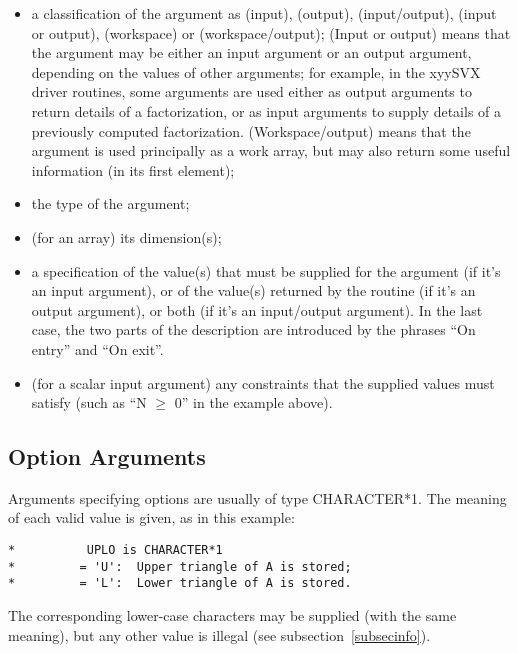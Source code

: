 \begin{itemize}

\item a classification of the argument as (input), (output),
(input/output), (input or output), (workspace) or (workspace/output);
(Input or output) means that the argument may be either an input argument or
an output argument, depending on the values of other arguments;
for example, in the xyySVX driver routines, some arguments are used either
as output arguments to return details of a factorization, or as input
arguments to supply details of a previously computed factorization.
(Workspace/output) means that the argument is used principally as a work
array, but may also return some useful information (in its first 
element);

\item the type of the argument;

\item (for an array) its dimension(s);

\item a specification of the value(s) that must be supplied for the
argument (if it's an input argument), or of the value(s) returned
by the routine (if it's an output argument), or both (if it's an
input/output argument). In the last case, the two parts of the
description are introduced by the phrases ``On entry'' and
``On exit''.

\item (for a scalar input argument) any constraints that the
supplied values must satisfy (such as  ``N $\geq$ 0'' in the
example above).

\end{itemize}

\subsection{Option Arguments}\label{subsecoptionargs}

Arguments specifying options are 
usually of type CHARACTER*1.
The meaning of each valid value is given, as in this 
example:

\begin{verbatim}
*          UPLO is CHARACTER*1
*         = 'U':  Upper triangle of A is stored;
*         = 'L':  Lower triangle of A is stored.
\end{verbatim}

The corresponding lower-case characters
may be supplied (with the same meaning), but any other value is illegal
(see subsection~\ref{subsecinfo}).

